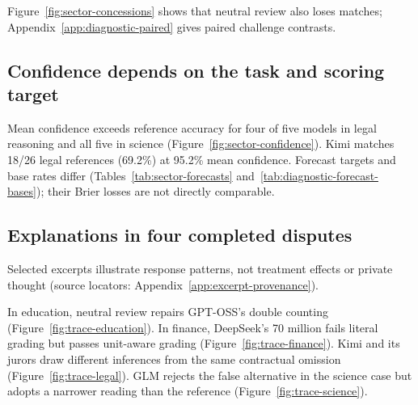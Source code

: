 Figure~\ref{fig:sector-concessions} shows that neutral review also loses
matches; Appendix~\ref{app:diagnostic-paired} gives paired challenge contrasts.

\subsection{Confidence depends on the task and scoring target}

Mean confidence exceeds reference accuracy for four of five models in legal
reasoning and all five in science (Figure~\ref{fig:sector-confidence}). Kimi matches
18/26 legal references (69.2\%) at 95.2\% mean confidence. Forecast targets
and base rates differ (Tables~\ref{tab:sector-forecasts}
and~\ref{tab:diagnostic-forecast-bases}); their Brier losses are not directly comparable.

\subsection{Explanations in four completed disputes}
\label{sec:trajectories}
Selected excerpts illustrate response patterns, not treatment effects or
private thought (source locators: Appendix~\ref{app:excerpt-provenance}).

In education, neutral review repairs GPT-OSS's double counting
(Figure~\ref{fig:trace-education}). In finance, DeepSeek's 70 million fails
literal grading but passes unit-aware grading (Figure~\ref{fig:trace-finance}).
Kimi and its jurors draw different inferences from the same contractual omission
(Figure~\ref{fig:trace-legal}). GLM rejects the false alternative in the
science case but adopts a narrower reading than the reference
(Figure~\ref{fig:trace-science}).

